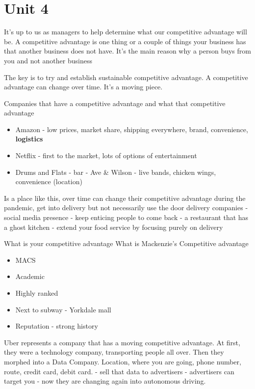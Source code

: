 \documentclass[11pt]{article}
\begin{document}
\section{Unit 4}

It's up to us as managers to help determine what our competitive advantage will be. A competitive advantage is one thing or a couple  of things your business has that another business does not have. It's the main reason why a person buys from you and not another business

The key is to try and establish sustainable competitive advantage. A competitive advantage can change over time. It's a moving piece.

Companies that have a competitive advantage and what that competitive advantage

\begin{itemize}
    \item Amazon - low prices, market share, shipping everywhere, brand, convenience, \textbf{logistics}
    \item Netflix - first to the market, lots of options of entertainment
    \item Drums and Flats - bar - Ave \& Wilson - live bands, chicken wings, convenience (location)
\end{itemize}

Is a place like this, over time can change their competitive advantage during the pandemic, get into delivery but not necessarily use the door delivery companies - social media presence - keep enticing people to come back - a restaurant that has a ghost kitchen - extend your food service by focusing purely on delivery

What is your competitive advantage 
What is Mackenzie's Competitive advantage
\begin{itemize}
    \item MACS
    \item Academic
    \item Highly ranked
    \item Next to subway - Yorkdale mall
    \item Reputation - strong history
\end{itemize}

Uber represents a company that has a moving competitive advantage. At first, they were a technology company, transporting people all over. Then they morphed into a Data Company. Location, where you are going, phone number, route, credit card, debit card. - sell that data to advertisers - advertisers can target you - now they are changing again into autonomous driving.
\end{document}
